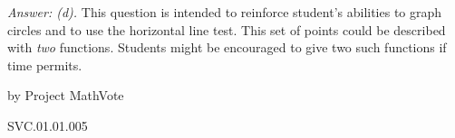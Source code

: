 {\it Answer: (d).}  This question is intended to reinforce student's abilities to graph circles and to use the horizontal line test.  This set of points could be described with \emph{two} functions.  Students might be encouraged to give two such functions if time permits.

\medskip
by Project MathVote

SVC.01.01.005

